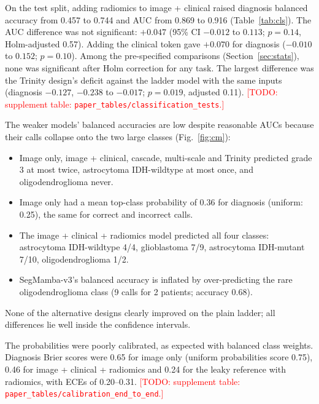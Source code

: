 \documentclass[11pt]{article}
\newcommand{\todo}[1]{\textcolor{red}{[TODO: #1]}}
\begin{document}
On the test split, adding radiomics to image + clinical raised diagnosis balanced accuracy from 0.457 to 0.744 and AUC
from 0.869 to 0.916 (Table~\ref{tab:cls}). The AUC difference was not significant: $+0.047$ (95\% CI $-0.012$ to
$0.113$; $p = 0.14$, Holm-adjusted 0.57). Adding the clinical token gave $+0.070$ for diagnosis ($-0.010$ to
$0.152$; $p = 0.10$). Among the pre-specified comparisons (Section~\ref{sec:stats}), none was significant after Holm
correction for any task. The largest difference was the Trinity design's deficit against the ladder model with the
same inputs (diagnosis $-0.127$, $-0.238$ to $-0.017$; $p = 0.019$, adjusted 0.11).
\todo{supplement table: \texttt{paper\_tables/classification\_tests}.}

The weaker models' balanced accuracies are low despite reasonable AUCs because their calls collapse onto the two
large classes (Fig.~\ref{fig:cm}):
\begin{itemize}
  \item Image only, image + clinical, cascade, multi-scale and Trinity predicted grade 3 at most twice, astrocytoma
        IDH-wildtype at most once, and oligodendroglioma never.
  \item Image only had a mean top-class probability of 0.36 for diagnosis (uniform: 0.25), the same for correct and
        incorrect calls.
  \item The image + clinical + radiomics model predicted all four classes: astrocytoma IDH-wildtype 4/4,
        glioblastoma 7/9, astrocytoma IDH-mutant 7/10, oligodendroglioma 1/2.
  \item SegMamba-v3's balanced accuracy is inflated by over-predicting the rare oligodendroglioma class (9 calls
        for 2 patients; accuracy 0.68).
\end{itemize}
None of the alternative designs clearly improved on the plain ladder; all differences lie well inside the confidence
intervals.

The probabilities were poorly calibrated, as expected with balanced class weights. Diagnosis Brier scores were 0.65
for image only (uniform probabilities score 0.75), 0.46 for image + clinical + radiomics and 0.24 for the leaky
reference with radiomics, with ECEs of 0.20--0.31. \todo{supplement table: \texttt{paper\_tables/calibration\_end\_to\_end}.}
\end{document}
